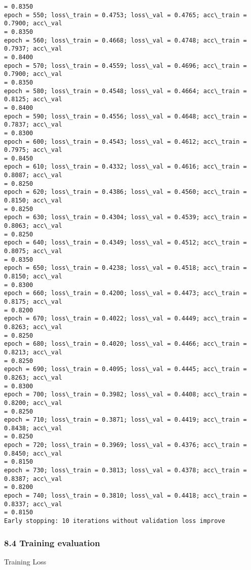 \documentclass[10pt]{article}
\begin{document}
\begin{Verbatim}[commandchars=\\\{\}]
= 0.8350
epoch = 550; loss\_train = 0.4753; loss\_val = 0.4765; acc\_train = 0.7900; acc\_val
= 0.8350
epoch = 560; loss\_train = 0.4668; loss\_val = 0.4748; acc\_train = 0.7937; acc\_val
= 0.8400
epoch = 570; loss\_train = 0.4559; loss\_val = 0.4696; acc\_train = 0.7900; acc\_val
= 0.8350
epoch = 580; loss\_train = 0.4548; loss\_val = 0.4664; acc\_train = 0.8125; acc\_val
= 0.8400
epoch = 590; loss\_train = 0.4556; loss\_val = 0.4648; acc\_train = 0.7837; acc\_val
= 0.8300
epoch = 600; loss\_train = 0.4543; loss\_val = 0.4612; acc\_train = 0.7975; acc\_val
= 0.8450
epoch = 610; loss\_train = 0.4332; loss\_val = 0.4616; acc\_train = 0.8087; acc\_val
= 0.8250
epoch = 620; loss\_train = 0.4386; loss\_val = 0.4560; acc\_train = 0.8150; acc\_val
= 0.8250
epoch = 630; loss\_train = 0.4304; loss\_val = 0.4539; acc\_train = 0.8063; acc\_val
= 0.8250
epoch = 640; loss\_train = 0.4349; loss\_val = 0.4512; acc\_train = 0.8075; acc\_val
= 0.8350
epoch = 650; loss\_train = 0.4238; loss\_val = 0.4518; acc\_train = 0.8150; acc\_val
= 0.8300
epoch = 660; loss\_train = 0.4200; loss\_val = 0.4473; acc\_train = 0.8175; acc\_val
= 0.8200
epoch = 670; loss\_train = 0.4022; loss\_val = 0.4449; acc\_train = 0.8263; acc\_val
= 0.8250
epoch = 680; loss\_train = 0.4020; loss\_val = 0.4466; acc\_train = 0.8213; acc\_val
= 0.8250
epoch = 690; loss\_train = 0.4095; loss\_val = 0.4445; acc\_train = 0.8263; acc\_val
= 0.8300
epoch = 700; loss\_train = 0.3982; loss\_val = 0.4408; acc\_train = 0.8200; acc\_val
= 0.8250
epoch = 710; loss\_train = 0.3871; loss\_val = 0.4419; acc\_train = 0.8438; acc\_val
= 0.8250
epoch = 720; loss\_train = 0.3969; loss\_val = 0.4376; acc\_train = 0.8450; acc\_val
= 0.8150
epoch = 730; loss\_train = 0.3813; loss\_val = 0.4378; acc\_train = 0.8387; acc\_val
= 0.8200
epoch = 740; loss\_train = 0.3810; loss\_val = 0.4418; acc\_train = 0.8337; acc\_val
= 0.8150
Early stopping: 10 iterations without validation loss improve
    \end{Verbatim}

    \hypertarget{training-evaluation}{%
\subsubsection{8.4 Training evaluation}\label{training-evaluation}}

    Training Loss
\end{document}
